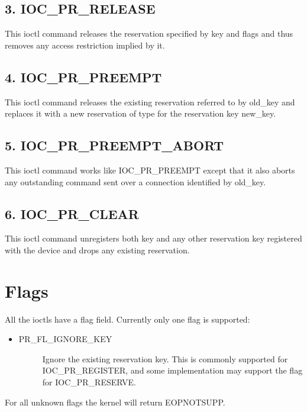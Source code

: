 \documentclass[a4paper,11pt,english]{sphinxmanual}
\begin{document}
\subsection{3. IOC\_PR\_RELEASE}
\label{\detokenize{pr:ioc-pr-release}}
This ioctl command releases the reservation specified by key and flags
and thus removes any access restriction implied by it.


\subsection{4. IOC\_PR\_PREEMPT}
\label{\detokenize{pr:ioc-pr-preempt}}
This ioctl command releases the existing reservation referred to by
old\_key and replaces it with a new reservation of type for the
reservation key new\_key.


\subsection{5. IOC\_PR\_PREEMPT\_ABORT}
\label{\detokenize{pr:ioc-pr-preempt-abort}}
This ioctl command works like IOC\_PR\_PREEMPT except that it also aborts
any outstanding command sent over a connection identified by old\_key.


\subsection{6. IOC\_PR\_CLEAR}
\label{\detokenize{pr:ioc-pr-clear}}
This ioctl command unregisters both key and any other reservation key
registered with the device and drops any existing reservation.


\section{Flags}
\label{\detokenize{pr:flags}}
All the ioctls have a flag field.  Currently only one flag is supported:
\begin{itemize}
\item {} \begin{description}
\item[{PR\_FL\_IGNORE\_KEY}] \leavevmode
Ignore the existing reservation key.  This is commonly supported for
IOC\_PR\_REGISTER, and some implementation may support the flag for
IOC\_PR\_RESERVE.

\end{description}

\end{itemize}

For all unknown flags the kernel will return \sphinxhyphen{}EOPNOTSUPP.
\end{document}
